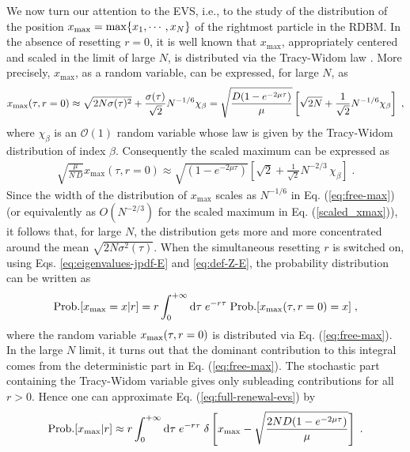 \documentclass[onecolumn,superscriptaddress,
 amsmath,amssymb,
 aps,
 prd,
]{revtex4-1}
\newcommand{\bea}{\begin{eqnarray}}
\newcommand{\eea}{\end{eqnarray}}
\begin{document}
{We now turn our attention to the EVS, i.e., to the study of the distribution of the position $x_{\rm max} = \max \{x_1, \cdots, x_N\}$ of the rightmost particle in the RDBM. In the absence of resetting $r=0$, it is well known that $x_{\max}$, appropriately centered and scaled in the limit of large $N$, is distributed via the 
Tracy-Widom law \cite{F10,TW94,TW96}. More precisely, $x_{\max}$, as a random variable, can be expressed, for large $N$, as  
\begin{equation}\label{eq:free-max}
x_{\rm max}(\tau, r = 0) \approx \sqrt{2 N \sigma(\tau)^2} + \frac{\sigma(\tau)}{\sqrt{2}} N^{-1/6} \chi_\beta = \sqrt{\frac{D (1 - e^{-2 \mu \tau})}{\mu}} \left[ \sqrt{2 N} + \frac{1}{\sqrt{2}} N^{-1/6} \chi_\beta\right] \;,
\end{equation}
where $\chi_\beta$ is an $\mathcal{O}(1)$ random variable whose law is given by the Tracy-Widom distribution of index $\beta$. Consequently the scaled maximum can be expressed as 
\bea \label{scaled_xmax}
\sqrt{\frac{\mu}{N\, D}} x_{\max}(\tau, r= 0)\approx \sqrt{(1 - e^{-2 \mu \tau})} \left[ \sqrt{2} + \frac{1}{\sqrt{2}} N^{-2/3}\, \chi_\beta\right] \;.
\eea
Since the width of the distribution of $x_{\max}$ scales as $N^{-1/6}$ in Eq. (\ref{eq:free-max}) (or equivalently as $O(N^{-2/3})$ for the scaled maximum in Eq. (\ref{scaled_xmax})), it follows that, for large $N$, the distribution gets more and more concentrated around the mean $\sqrt{2 N \sigma^2(\tau)}$. When the simultaneous resetting $r$ is switched on, using Eqs. \eqref{eq:eigenvalues-jpdf-E} and \eqref{eq:def-Z-E}, 
the probability distribution can be written as  
\begin{equation} \label{eq:full-renewal-evs}
{\rm Prob.}[x_{\rm max} = x | r] = r \int_0^{+\infty} \dd \tau \; e^{-r \tau}\; {\rm Prob.}[x_{\rm max}(\tau,r=0) = x] \;,
\end{equation}
where the random variable $x_{\rm max}(\tau, r = 0)$ is distributed via Eq. (\ref{eq:free-max}). In the large $N$ limit, it turns out that the dominant contribution to this integral comes from the deterministic part in Eq. (\ref{eq:free-max}). The stochastic part containing the Tracy-Widom variable gives only subleading contributions for all $r>0$. Hence one can approximate Eq. (\ref{eq:full-renewal-evs}) by
\begin{equation} \label{eq:full-renewal-evs-delta}
{\rm Prob.}[x_{\rm max} | r] \approx r \int_0^{+\infty} \dd \tau \; e^{-r \tau}\; \delta\left[x_{\rm max} - \sqrt{\frac{2 N D(1 - e^{-2\mu \tau})}{\mu}}\right] \;.
\end{equation} 
}
\end{document}
